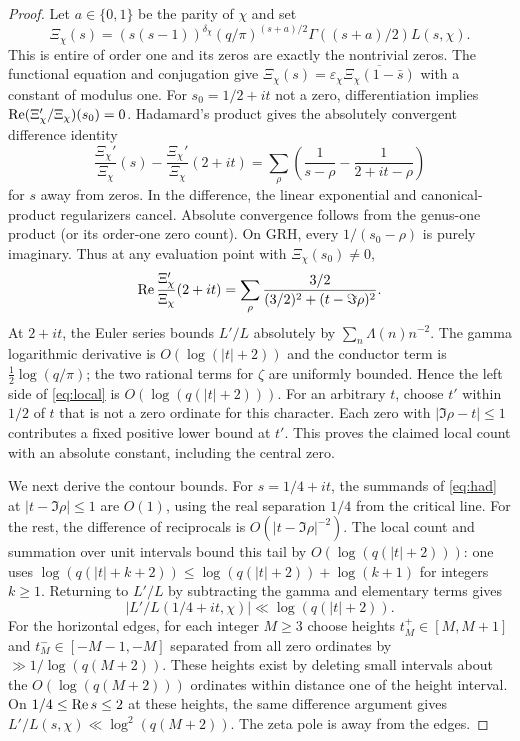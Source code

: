 \documentclass[11pt]{article}
\theoremstyle{remark}\newtheorem{remark}[theorem]{Remark}
\begin{document}
\begin{proof}
Let $a\in\{0,1\}$ be the parity of $\chi$ and set
\[
\Xi_\chi(s)=(s(s-1))^{\delta_\chi}
(q/\pi)^{(s+a)/2}\Gamma((s+a)/2)L(s,\chi).
\]
This is entire of order one and its zeros are exactly the nontrivial zeros. The functional equation and conjugation give $\Xi_\chi(s)=\varepsilon_\chi\overline{\Xi_\chi(1-\bar s)}$ with a constant of modulus one. For $s_0=1/2+it$ not a zero, differentiation implies $\operatorname{Re}(\Xi_\chi'/\Xi_\chi)(s_0)=0$. Hadamard's product gives the absolutely convergent difference identity
\begin{equation}\label{eq:had}
\frac{\Xi_\chi'}{\Xi_\chi}(s)-\frac{\Xi_\chi'}{\Xi_\chi}(2+it)
=\sum_\rho\left(\frac1{s-\rho}-\frac1{2+it-\rho}\right)
\end{equation}
for $s$ away from zeros. In the difference, the linear exponential and canonical-product regularizers cancel. Absolute convergence follows from the genus-one product (or its order-one zero count). On GRH, every $1/(s_0-\rho)$ is purely imaginary. Thus at any evaluation point with $\Xi_\chi(s_0)\ne0$,
\begin{equation}\label{eq:local}
\operatorname{Re}\frac{\Xi_\chi'}{\Xi_\chi}(2+it)
=\sum_\rho\frac{3/2}{(3/2)^2+(t-\Im\rho)^2}.
\end{equation}
At $2+it$, the Euler series bounds $L'/L$ absolutely by $\sum_n\Lambda(n)n^{-2}$. The gamma logarithmic derivative is $O(\log(|t|+2))$ and the conductor term is $\frac12\log(q/\pi)$; the two rational terms for $\zeta$ are uniformly bounded. Hence the left side of \eqref{eq:local} is $O(\log(q(|t|+2)))$. For an arbitrary $t$, choose $t'$ within $1/2$ of $t$ that is not a zero ordinate for this character. Each zero with $|\Im\rho-t|\le1$ contributes a fixed positive lower bound at $t'$. This proves the claimed local count with an absolute constant, including the central zero.

We next derive the contour bounds. For $s=1/4+it$, the summands of \eqref{eq:had} at $|t-\Im\rho|\le1$ are $O(1)$, using the real separation $1/4$ from the critical line. For the rest, the difference of reciprocals is $O(|t-\Im\rho|^{-2})$. The local count and summation over unit intervals bound this tail by $O(\log(q(|t|+2)))$: one uses $\log(q(|t|+k+2))\le\log(q(|t|+2))+\log(k+1)$ for integers $k\ge1$. Returning to $L'/L$ by subtracting the gamma and elementary terms gives
\[
|L'/L(1/4+it,\chi)|\ll\log(q(|t|+2)).
\]
For the horizontal edges, for each integer $M\ge3$ choose heights $t_M^+\in[M,M+1]$ and $t_M^-\in[-M-1,-M]$ separated from all zero ordinates by $\gg1/\log(q(M+2))$. These heights exist by deleting small intervals about the $O(\log(q(M+2)))$ ordinates within distance one of the height interval. On $1/4\le\operatorname{Re} s\le2$ at these heights, the same difference argument gives $L'/L(s,\chi)\ll\log^2(q(M+2))$. The zeta pole is away from the edges.


\end{proof}
\end{document}

